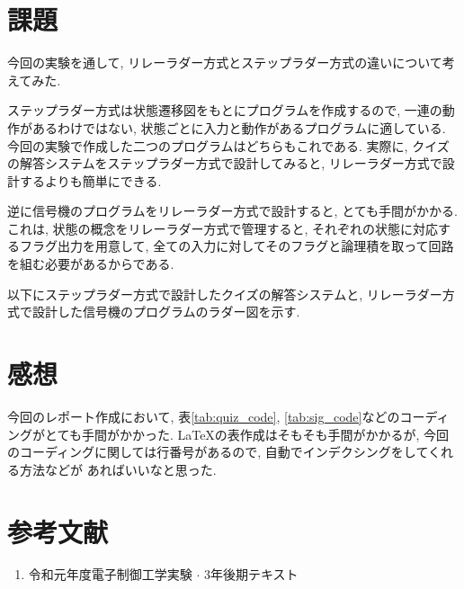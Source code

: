 \documentclass[titlepage]{jsarticle}
\begin{document}
\section{課題}
  今回の実験を通して, リレーラダー方式とステップラダー方式の違いについて考えてみた.

  ステップラダー方式は状態遷移図をもとにプログラムを作成するので,
  一連の動作があるわけではない, 状態ごとに入力と動作があるプログラムに適している.
  今回の実験で作成した二つのプログラムはどちらもこれである.
  実際に, クイズの解答システムをステップラダー方式で設計してみると,
  リレーラダー方式で設計するよりも簡単にできる.

  逆に信号機のプログラムをリレーラダー方式で設計すると,
  とても手間がかかる.
  これは, 状態の概念をリレーラダー方式で管理すると,
  それぞれの状態に対応するフラグ出力を用意して,
  全ての入力に対してそのフラグと論理積を取って回路を組む必要があるからである.

  以下にステップラダー方式で設計したクイズの解答システムと,
  リレーラダー方式で設計した信号機のプログラムのラダー図を示す.
\section{感想}
  今回のレポート作成において,
  表\ref{tab:quiz_code}, \ref{tab:sig_code}などのコーディングがとても手間がかかった.
  \LaTeX の表作成はそもそも手間がかかるが,
  今回のコーディングに関しては行番号があるので, 自動でインデクシングをしてくれる方法などが
  あればいいなと思った.
\section*{参考文献}
  \begin{enumerate}
    \item 令和元年度電子制御工学実験 $\cdot$ 3年後期テキスト
  \end{enumerate}
\end{document}
